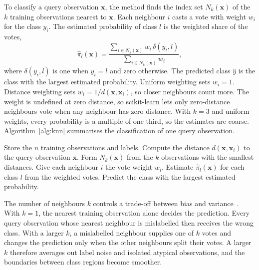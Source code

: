 \documentclass[conference]{IEEEtran}
\begin{document}
To classify a query observation $\mathbf{x}$, the method finds the index set $N_k(\mathbf{x})$ of the $k$ training observations nearest to $\mathbf{x}$. Each neighbour $i$ casts a vote with weight $w_i$ for the class $y_i$. The estimated probability of class $l$ is the weighted share of the votes,
\begin{equation}
    \hat{\pi}_l(\mathbf{x}) = \frac{\sum_{i\in N_k(\mathbf{x})} w_i\,\delta(y_i,l)}{\sum_{i\in N_k(\mathbf{x})} w_i},
\end{equation}
where $\delta(y_i,l)$ is one when $y_i=l$ and zero otherwise. The predicted class $\hat{y}$ is the class with the largest estimated probability. Uniform weighting sets $w_i=1$. Distance weighting sets $w_i = 1/d(\mathbf{x},\mathbf{x}_i)$, so closer neighbours count more. The weight is undefined at zero distance, so scikit-learn lets only zero-distance neighbours vote when any neighbour has zero distance. With $k=3$ and uniform weights, every probability is a multiple of one third, so the estimates are coarse. Algorithm~\ref{alg:knn} summarises the classification of one query observation.

\begin{algorithm}[!t]
    \caption{Nearest neighbour classification of one query observation}
    \label{alg:knn}
    \begin{algorithmic}[1]
        \STATE Store the $n$ training observations and labels.
        \STATE Compute the distance $d(\mathbf{x},\mathbf{x}_i)$ to the query observation $\mathbf{x}$.
        \ENDFOR
        \STATE Form $N_k(\mathbf{x})$ from the $k$ observations with the smallest distances.
        \STATE Give each neighbour $i$ the vote weight $w_i$.
        \STATE Estimate $\hat{\pi}_l(\mathbf{x})$ for each class $l$ from the weighted votes.
        \STATE Predict the class with the largest estimated probability.
    \end{algorithmic}
\end{algorithm}

The number of neighbours $k$ controls a trade-off between bias and variance~\cite{hastie2009}. With $k=1$, the nearest training observation alone decides the prediction. Every query observation whose nearest neighbour is mislabelled then receives the wrong class. With a larger $k$, a mislabelled neighbour supplies one of $k$ votes and changes the prediction only when the other neighbours split their votes. A larger $k$ therefore averages out label noise and isolated atypical observations, and the boundaries between class regions become smoother.
\end{document}
